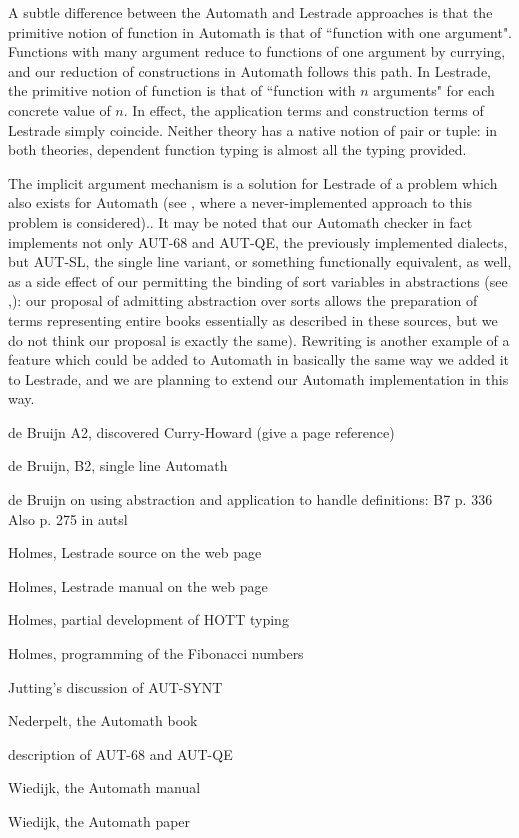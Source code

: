 \documentclass{article}
\begin{document}
A subtle difference between the Automath and Lestrade approaches is that the primitive notion of function in Automath is that of ``function with one argument".  Functions with many argument reduce to functions of one argument by currying, and our reduction of constructions in Automath follows this path.  In Lestrade, the primitive notion of function is that of ``function with $n$ arguments" for each concrete value of $n$.  In effect, the application terms and construction terms of Lestrade simply coincide.  Neither theory has a native notion
of pair or tuple:  in both theories, dependent function typing is almost all the typing provided.

The implicit argument mechanism is a solution for Lestrade of a problem which also exists for Automath (see \cite{autsynt}, where a never-implemented approach to this problem is considered)..  It may be noted that our Automath checker in fact implements not only AUT-68 and AUT-QE, the previously implemented dialects, but AUT-SL, the single line variant, or something functionally equivalent, as well, as a side effect of our permitting the binding of sort variables in abstractions (see \cite{autsl},\cite{autlambda}):   our proposal of admitting abstraction over sorts allows the preparation of terms representing entire books essentially as described in these sources, but we do not think our proposal is exactly the same).  Rewriting is another example of a feature which could be added to Automath in basically the same way we added it to Lestrade, and we are planning to extend our Automath implementation in this way.

\begin{thebibliography}{99}

 de Bruijn A2, discovered Curry-Howard (give a page reference)

   de Bruijn, B2, single line Automath

  de Bruijn on using abstraction and application to handle definitions:  B7 p. 336  Also p. 275 in autsl

  Holmes, Lestrade source on the web page

 Holmes, Lestrade manual on the web page

 Holmes, partial development of HOTT typing

  Holmes, programming of the Fibonacci numbers

  Jutting's discussion of AUT-SYNT

  Nederpelt, the Automath book

  description of AUT-68 and AUT-QE

 Wiedijk, the Automath manual

  Wiedijk, the Automath paper

\end{thebibliography}
\end{document}
